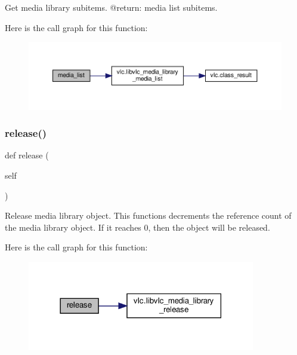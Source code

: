 \begin{DoxyVerb}Get media library subitems.
@return: media list subitems.
\end{DoxyVerb}
 Here is the call graph for this function\+:
\nopagebreak
\begin{figure}[H]
\begin{center}
\leavevmode
\includegraphics[width=350pt]{classvlc_1_1_media_library_a34194a0d394238d8794d182b65953952_cgraph}
\end{center}
\end{figure}
\mbox{\label{classvlc_1_1_media_library_a4cd51e19135e5ad4a19eae3ea9c60537}} 
\subsubsection{\texorpdfstring{release()}{release()}}
{\footnotesize\ttfamily def release (\begin{DoxyParamCaption}\item[{}]{self }\end{DoxyParamCaption})}

\begin{DoxyVerb}Release media library object. This functions decrements the
reference count of the media library object. If it reaches 0,
then the object will be released.
\end{DoxyVerb}
 Here is the call graph for this function\+:
\nopagebreak
\begin{figure}[H]
\begin{center}
\leavevmode
\includegraphics[width=282pt]{classvlc_1_1_media_library_a4cd51e19135e5ad4a19eae3ea9c60537_cgraph}
\end{center}
\end{figure}
\mbox{\label{classvlc_1_1_media_library_a6394d82a0b79f0f91bb059d20ab43490}} 
